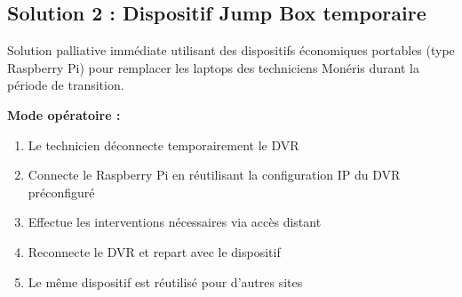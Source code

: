 \documentclass{dollarama}
\begin{document}

\subsection{Solution 2 : Dispositif Jump Box temporaire}

Solution palliative immédiate utilisant des dispositifs économiques portables (type Raspberry Pi) pour remplacer les laptops des techniciens Monéris durant la période de transition.

\textbf{Mode opératoire :}
\begin{enumerate}
\item Le technicien déconnecte temporairement le DVR
\item Connecte le Raspberry Pi en réutilisant la configuration IP du DVR préconfiguré
\item Effectue les interventions nécessaires via accès distant
\item Reconnecte le DVR et repart avec le dispositif
\item Le même dispositif est réutilisé pour d'autres sites
\end{enumerate}


\end{document}
